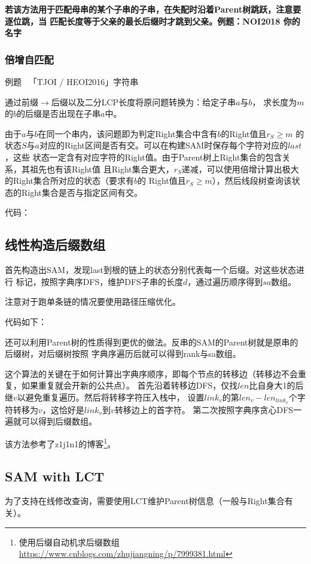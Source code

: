 {\bfseries 若该方法用于匹配母串的某个子串的子串，在失配时沿着Parent树跳跃，注意要逐位跳，当
匹配长度等于父亲的最长后缀时才跳到父亲。例题：NOI2018 你的名字}
\subsubsection{倍增自匹配}
例题~ 「TJOI / HEOI2016」字符串

通过前缀$\rightarrow$后缀以及二分LCP长度将原问题转换为：给定子串$a$与$b$，
求长度为$m$的$b$的后缀是否出现在子串$a$中。

由于$a$与$b$在同一个串内，该问题即为判定Right集合中含有$b$的Right值且$r_S\geq m$
的状态$S$与$a$对应的Right区间是否有交。可以在构建SAM时保存每个字符对应的$last$，这些
状态一定含有对应字符的Right值。由于Parent树上Right集合的包含关系，其祖先也有该Right值
且Right集合更大，$r_S$递减，可以使用倍增计算出极大的Right集合所对应的状态（要求有$b$的
Right值且$r_S\geq m$），然后线段树查询该状态的Right集合是否与指定区间有交。

代码：

\subsection{线性构造后缀数组}
首先构造出SAM，发现last到根的链上的状态分别代表每一个后缀。对这些状态进行
标记，按照字典序DFS，维护DFS子串的长度$d$，通过遍历顺序得到$sa$数组。

注意对于跑单条链的情况要使用路径压缩优化。

代码如下：


还可以利用Parent树的性质得到更优的做法。反串的SAM的Parent树就是原串的后缀树，对后缀树按照
字典序遍历后就可以得到rank与sa数组。

这个算法的关键在于如何计算出字典序顺序，即每个节点的转移边（转移边不会重复，如果重复就会开新的公共点）。
首先沿着转移边DFS，仅找$len$比自身大1的后继$v$以避免重复遍历。然后将转移字符压入栈中，
设置$link_v$的第$len_v-len_{link_v}$个字符转移为$v$，这恰好是$link_v$到$v$转移边上的首字符。
第二次按照字典序贪心DFS一遍就可以得到后缀数组。

该方法参考了z1j1n1的博客\footnote{
    使用后缀自动机求后缀数组\\
    \url{https://www.cnblogs.com/zhujiangning/p/7999381.html}
}。

\subsection{SAM with LCT}
为了支持在线修改查询，需要使用LCT维护Parent树信息（一般与Right集合有关）。

